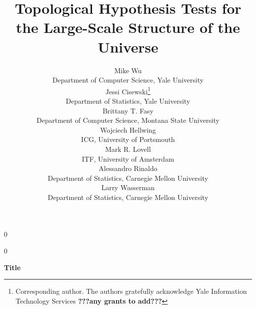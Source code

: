 \documentclass[12pt]{article}
\newcommand{\blind}{0}
\begin{document}
%

\def\spacingset#1{\renewcommand{\baselinestretch}%
{#1}\small\normalsize} \spacingset{1}



\blind
{
  \title{\bf Topological Hypothesis Tests for the Large-Scale Structure of the Universe}
  \author{Mike Wu\\
    Department of Computer Science, Yale University \\
    Jessi Cisewski\thanks{
    Corresponding author.  The authors gratefully acknowledge Yale Information Technology Services {\bf ???any grants to add???}}\hspace{.2cm} \\
    Department of Statistics, Yale University \\
    Brittany T. Fasy\\
    Department of Computer Science, Montana State University \\
    Wojciech Hellwing \\
    ICG, University of Portsmouth \\
    Mark R. Lovell\\
    ITF, University of Amsterdam \\
    Alessandro Rinaldo\\
    Department of Statistics, Carnegie Mellon University \\
    Larry Wasserman\\
    Department of Statistics, Carnegie Mellon University \\
  }
  \maketitle
} \fi

\blind
{
  \bigskip
  \begin{center}
    {\LARGE\bf Title}
\end{center}
  \medskip
} \fi

\end{document}
